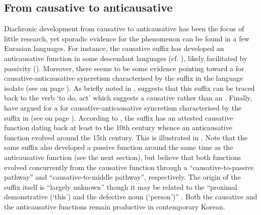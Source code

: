 \subsection{From causative to anticausative} \label{diachrony:caus2antc}
Diachronic development from causative to anticausative has been the focus of little research, yet sporadic evidence for the phenomenon can be found in a few Eurasian languages. For instance, the  causative suffix  has developed an anticausative function in some descendant languages (cf.  ), likely facilitated by passivity (). Moreover, there seems to be some evidence pointing toward a  for causative-anticausative syncretism characterised by the suffix  in the language isolate  (see  on page \pageref{tab:ch4:caus-antc}). As briefly noted in , \citet{nonno:2015} suggests that this suffix can be traced back to the verb  ‘to do, act’ which suggests a causative rather than an . Finally, \citet{yap:ahn:2019} have argued for a  for causative-anticausative syncretism characterised by the suffix  in  (see  on page \pageref{tab:ch5:caus-pass-antc}). According to \citet[3ff., 9f.]{yap:ahn:2019}, the  suffix  has an attested causative function dating back at least to the 10th century whence an anticausative function evolved around the 15th century. This  is illustrated in . Note that the same suffix also developed a passive function around the same time as the anticausative function (see the next section), but \citet[16ff.]{yap:ahn:2019} believe that both functions evolved concurrently from the causative function through a “causative-to-passive pathway” and “causative-to-middle pathway”, respectively. The origin of the suffix  itself is “largely unknown” though it may be related to the “proximal demonstrative  (‘this’) and the defective noun  (‘person’)” \citep[20]{yap:ahn:2019}. Both the causative and the anticausative functions remain productive in contemporary Korean. 


